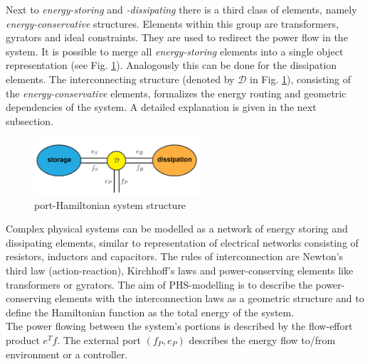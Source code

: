 \documentclass[a4paper,twoside, openright,12pt]{report}
\begin{document}
Next to \emph{energy-storing} and \emph{-dissipating} there is a third class of elements, namely \emph{energy-conservative} structures. Elements within this group are transformers, gyrators and ideal constraints. They are used to redirect the power flow in the system. It is possible to merge all \emph{energy-storing} elements into a single object representation (see Fig. \ref{FIG:pHsstructure}). Analogously this can be done for the dissipation elements. The interconnecting structure (denoted by $\mathcal{D}$ in Fig. \ref{FIG:pHsstructure}), consisting of the \emph{energy-conservative} elements, formalizes the energy routing and geometric dependencies of the system. A detailed explanation is given in the next subsection.


\begin{figure}[htb]
	\centering
	\includegraphics[width=0.55\textwidth]{diracstructure.png}
	\caption[port-Hamiltonian system structure]{port-Hamiltonian system structure \cite{vanderSchaft_06}}
	\label{FIG:pHsstructure}
\end{figure}

Complex physical systems can be modelled as a network of energy storing and dissipating elements, similar to representation of electrical networks consisting of resistors, inductors and capacitors. The rules of interconnection are Newton's third law (action-reaction), Kirchhoff's laws and power-conserving elements like transformers or gyrators. The aim of PHS-modelling is to describe the power-conserving elements with the interconnection laws as a geometric structure and to define the Hamiltonian function as the total energy of the system. \\
The power flowing between the system's portions is described by the flow-effort product $e^Tf$. The external port $(f_P,e_P)$ describes the energy flow to/from environment or a controller. 
\end{document}

